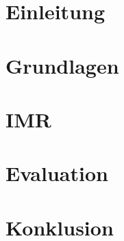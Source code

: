 \documentclass[12pt,twoside]{article}
\theoremstyle{plain}
\theoremstyle{definition}
\theoremstyle{remark}
\begin{document}
\section{Einleitung}

\section{Grundlagen} 
\label{sec:grundlagen}

\section{IMR}\label{sec:IMR}
\label{sec:methods}

\section{Evaluation}
\label{sec:evaluation}

\section{Konklusion}


%

\newpage

\end{document}
